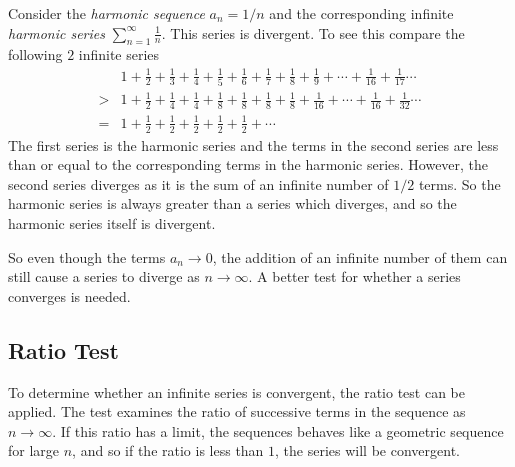 \documentclass[11pt,a4paper,titlepage,oneside,openany]{article}
\begin{document}
Consider the \emph{harmonic sequence} $a_n=1/n$ and the corresponding infinite \emph{harmonic series} $\displaystyle \sum_{n=1}^{\infty} \frac{1}{n}$. This series is divergent. To see this compare the following $2$ infinite series
\begin{align*}
  &1+\frac{1}{2}+\frac{1}{3}+\frac{1}{4}+\frac{1}{5}+\frac{1}{6}+\frac{1}{7}+\frac{1}{8}+\frac{1}{9}+\cdots+\frac{1}{16}+\frac{1}{17}\cdots\\
  >&1+\frac{1}{2}+\frac{1}{4}+\frac{1}{4}+\frac{1}{8}+\frac{1}{8}+\frac{1}{8}+\frac{1}{8}+\frac{1}{16}+\cdots+\frac{1}{16}+\frac{1}{32}\cdots\\
  = & 1+\frac{1}{2}+\frac{1}{2}+\frac{1}{2}+\frac{1}{2}+\frac{1}{2}+\cdots
\end{align*}
The first series is the harmonic series and the terms in the second series are less than or equal to the corresponding terms in the harmonic series. However, the second series diverges as it is the sum of an infinite number of $1/2$ terms. So the harmonic series is always greater than a series which diverges, and so the harmonic series itself is divergent.

So even though the terms $a_n \to 0$, the addition of an infinite number of them can still cause a series to diverge as $n \to \infty $. A better test for whether a series converges is needed.

\subsection*{Ratio Test}
To determine whether an infinite series is convergent, the ratio test can be applied. The test examines the ratio of successive terms in the sequence as $n \to \infty$. If this ratio has a limit, the sequences behaves like a geometric sequence for large $n$, and so if the ratio is less than $1$, the series will be convergent.
\end{document}
